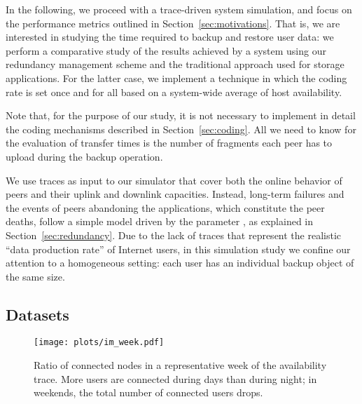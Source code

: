 In the following, we proceed with a trace-driven system simulation,
and focus on the performance metrics outlined in
Section~\ref{sec:motivations}. That is, we are interested in studying the
time required to backup and restore user data: we perform a
comparative study of the results achieved by a system using our
redundancy management scheme and the traditional approach used for
storage applications. For the latter case, we implement a technique in
which the coding rate is set once and for all based on a system-wide
average of host availability.

Note that, for the purpose of our study, it is not necessary to
implement in detail the coding mechanisms described in
Section~\ref{sec:coding}. All we need to know for the evaluation of
transfer times is the number of fragments each peer has to upload
during the backup operation.

We use traces as input to our simulator that cover both the online
behavior of peers and their uplink and downlink capacities. Instead,
long-term failures and the events of peers abandoning the
applications, which constitute the peer deaths, follow a simple model
driven by the parameter , as explained in
Section~\ref{sec:redundancy}. Due to the lack of traces that represent
the realistic ``data production rate'' of Internet users, in this
simulation study we confine our attention to a homogeneous setting:
each user has an individual backup object of the same size.

\subsection{Datasets}\label{sec:datasets}

\begin{figure}
\centering
\texttt{[image: plots/im\_week.pdf]}
\caption{Ratio of connected nodes in a representative week of the availability
trace. More users are connected during days than during night; in weekends, the total number of connected users drops.}
\label{fig:im-week}
\end{figure}

